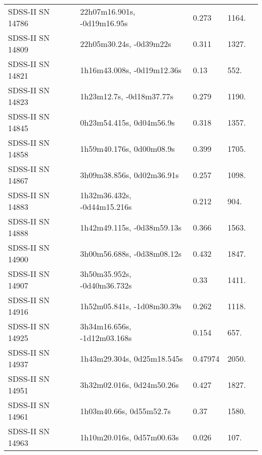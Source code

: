 \begin{longtable}{lllll}
 SDSS-II SN 14786 &    22h07m16.901s, -0d19m16.95s &    0.273 &          1164. &    \citet{2011ApJ...738..162S} \\
 SDSS-II SN 14809 &        22h05m30.24s, -0d39m22s &    0.311 &          1327. &    \citet{2010ApJ...713.1026D} \\
 SDSS-II SN 14821 &     1h16m43.008s, -0d19m12.36s &     0.13 &           552. &    \citet{2011ApJ...738..162S} \\
 SDSS-II SN 14823 &       1h23m12.7s, -0d18m37.77s &    0.279 &          1190. &    \citet{2010ApJ...713.1026D} \\
 SDSS-II SN 14845 &       0h23m54.415s, 0d04m56.9s &    0.318 &          1357. &    \citet{2011ApJ...738..162S} \\
 SDSS-II SN 14858 &       1h59m40.176s, 0d00m08.9s &    0.399 &          1705. &    \citet{2011ApJ...738..162S} \\
 SDSS-II SN 14867 &      3h09m38.856s, 0d02m36.91s &    0.257 &          1098. &    \citet{2011ApJ...738..162S} \\
 SDSS-II SN 14883 &    1h32m36.432s, -0d44m15.216s &    0.212 &           904. &    \citet{2011ApJ...738..162S} \\
 SDSS-II SN 14888 &     1h42m49.115s, -0d38m59.13s &    0.366 &          1563. &    \citet{2010ApJ...713.1026D} \\
 SDSS-II SN 14900 &     3h00m56.688s, -0d38m08.12s &    0.432 &          1847. &    \citet{2010ApJ...713.1026D} \\
 SDSS-II SN 14907 &    3h50m35.952s, -0d40m36.732s &     0.33 &          1411. &    \citet{2011ApJ...738..162S} \\
 SDSS-II SN 14916 &     1h52m05.841s, -1d08m30.39s &    0.262 &          1118. &    \citet{2011ApJ...738..162S} \\
 SDSS-II SN 14925 &    3h34m16.656s, -1d12m03.168s &    0.154 &           657. &    \citet{2011ApJ...738..162S} \\
 SDSS-II SN 14937 &     1h43m29.304s, 0d25m18.545s &  0.47974 &          2050. &    \citet{2016SDSSD.C...0000:} \\
 SDSS-II SN 14951 &      3h32m02.016s, 0d24m50.26s &    0.427 &          1827. &    \citet{2010ApJ...713.1026D} \\
 SDSS-II SN 14961 &        1h03m40.66s, 0d55m52.7s &     0.37 &          1580. &    \citet{2010ApJ...713.1026D} \\
 SDSS-II SN 14963 &      1h10m20.016s, 0d57m00.63s &    0.026 &           107. &    \citet{2011ApJ...738..162S} \\

\end{longtable}
